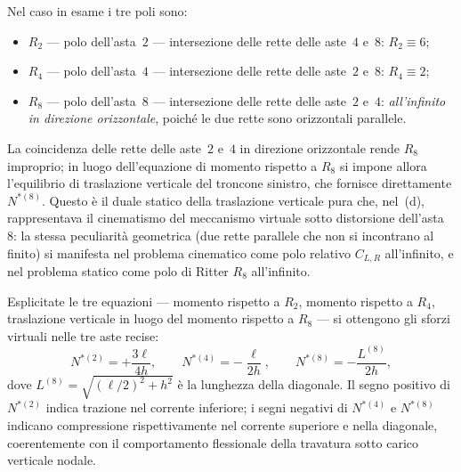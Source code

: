 \begin{esempio}
\begin{svolgimento}
		Nel caso in esame i tre poli sono:
		\begin{itemize}[noitemsep,topsep=2pt]
			\item $R_2$ --- polo dell'asta~$2$ --- intersezione delle rette
			delle aste~$4$ e~$8$: $R_2\equiv 6$;
			\item $R_4$ --- polo dell'asta~$4$ --- intersezione delle rette
			delle aste~$2$ e~$8$: $R_4\equiv 2$;
			\item $R_8$ --- polo dell'asta~$8$ --- intersezione delle rette
			delle aste~$2$ e~$4$: \emph{all'infinito in direzione
				orizzontale}, poiché le due rette sono orizzontali parallele.
		\end{itemize}
		
		La coincidenza delle rette delle aste~$2$ e~$4$ in direzione
		orizzontale rende $R_8$ improprio; in luogo dell'equazione di
		momento rispetto a $R_8$ si impone allora l'equilibrio di
		traslazione verticale del troncone sinistro, che fornisce
		direttamente $N^{*(8)}$. Questo è il duale statico della
		traslazione verticale pura che, nel
		\,(d), rappresentava il cinematismo
		del meccanismo virtuale sotto distorsione dell'asta~$8$: la stessa
		peculiarità geometrica (due rette parallele che non si incontrano
		al finito) si manifesta nel problema cinematico come polo relativo
		$C_{L,R}$ all'infinito, e nel problema statico come polo di Ritter
		$R_8$ all'infinito.
		
		Esplicitate le tre equazioni --- momento rispetto a $R_2$, momento
		rispetto a $R_4$, traslazione verticale in luogo del momento
		rispetto a $R_8$ --- si ottengono gli sforzi virtuali nelle tre
		aste recise:
		\begin{equation*}
			N^{*(2)} = +\frac{3\ell}{4h}, \qquad
			N^{*(4)} = -\frac{\ell}{2h}, \qquad
			N^{*(8)} = -\frac{L^{(8)}}{2h},
		\end{equation*}
		dove $L^{(8)}=\sqrt{(\ell/2)^2+h^2}$ è la lunghezza della diagonale.
		Il segno positivo di $N^{*(2)}$ indica trazione nel corrente
		inferiore; i segni negativi di $N^{*(4)}$ e $N^{*(8)}$ indicano
		compressione rispettivamente nel corrente superiore e nella
		diagonale, coerentemente con il comportamento flessionale della
		travatura sotto carico verticale nodale.
		

\end{svolgimento}
\end{esempio}
